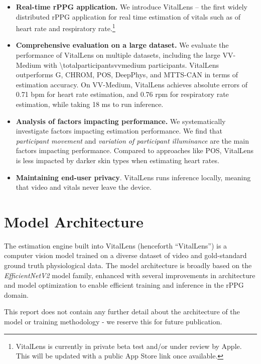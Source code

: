 \documentclass{article}
\begin{document}
\begin{itemize}
	\item \textbf{Real-time rPPG application.} We introduce VitalLens -- the first widely distributed rPPG application for real time estimation of vitals such as of heart rate and respiratory rate.\footnote{VitalLens is currently in private beta test and/or under review by Apple. This will be updated with a public App Store link once available.} 
	\item \textbf{Comprehensive evaluation on a large dataset.} We evaluate the performance of VitalLens on multiple datasets, including the large VV-Medium \cite{toye2023vital} with \num{\totalparticipantsvvmedium} participants. VitalLens outperforms G, CHROM, POS, DeepPhys, and MTTS-CAN in terms of estimation accuracy. On VV-Medium, VitalLens achieves absolute errors of 0.71 bpm for heart rate estimation, and 0.76 rpm for respiratory rate estimation, while taking 18 ms to run inference.
	\item \textbf{Analysis of factors impacting performance.} We systematically investigate factors impacting estimation performance. We find that \textit{participant movement} and \textit{variation of participant illuminance} are the main factors impacting performance. Compared to approaches like POS, VitalLens is less impacted by darker skin types when estimating heart rates. 
	\item \textbf{Maintaining end-user privacy}. VitalLens runs inference locally, meaning that video and vitals never leave the device.
\end{itemize}

\section{Model Architecture}
\label{sec:scope}

The estimation engine built into VitalLens (henceforth ``VitalLens'') is a computer vision model trained on a diverse dataset of video and gold-standard ground truth physiological data.
The model architecture is broadly based on the \textit{EfficientNetV2} \cite{tan2021efficient} model family, enhanced with several improvements in architecture and model optimization to enable efficient training and inference in the rPPG domain.

This report does not contain any further detail about the architecture of the model or training methodology - we reserve this for future publication.
\end{document}
